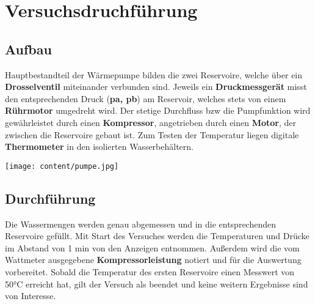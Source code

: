 \section{Versuchsdruchführung}
\label{sec:Versuchsdruchführung}


 


\noindent\begin{minipage}{0.5\textwidth}
\subsection{Aufbau}
\label{sec:Aufbau}
Hauptbestandteil der Wärmepumpe bilden die zwei Reservoire, welche über ein  \\
\textbf{Drosselventil} miteinander verbunden sind. Jeweils ein \textbf{Druckmessgerät} misst 
den entsprechenden Druck (\textbf{pa, pb}) am Reservoir, welches stets von einem \textbf{Rührmotor} umgedreht wird.
Der stetige Durchfluss bzw die Pumpfunktion wird gewährleistet durch einen \textbf{Kompressor}, angetrieben durch einen \textbf{Motor}, %
 der zwischen die Reservoire gebaut ist. Zum Testen der Temperatur liegen digitale 
\textbf{Thermometer} in den isolierten Wasserbehältern.
\end{minipage}
\hfill
\begin{minipage}{0.5\textwidth}\raggedleft
\vspace{2cm}
\texttt{[image: content/pumpe.jpg]}

\end{minipage}


\subsection{Durchführung}
\label{sec:Durchfuehrung}
Die Wassermengen werden genau abgemessen und in die entsprechenden Reservoire gefüllt. %
Mit Start des Versuches werden die Temperaturen und Drücke im Abstand von 1 min von den Anzeigen entnommen. Außerdem wird die vom Wattmeter ausgegebene \textbf{Kompressorleistung} notiert und für 
die Auswertung vorbereitet. Sobald die Temperatur des ersten Reservoire einen Messwert von 50°C erreicht hat, gilt der Versuch als beendet und keine weitern Ergebnisse sind von Interesse.
